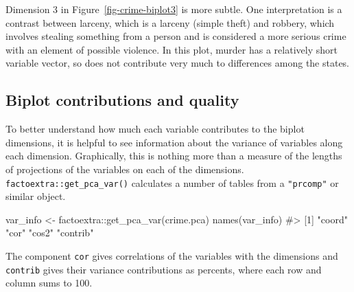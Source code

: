 \documentclass[
  letterpaper,
  10pt,
  krantz2]{krantz}
\makeatletter
\newenvironment{Shaded}{\begin{snugshade}}{\end{snugshade}}
\newcommand{\CommentTok}[1]{\textcolor[rgb]{0.37,0.37,0.37}{#1}}
\newcommand{\FunctionTok}[1]{\textcolor[rgb]{0.28,0.35,0.67}{#1}}
\newcommand{\NormalTok}[1]{\textcolor[rgb]{0.00,0.23,0.31}{#1}}
\newcommand{\OtherTok}[1]{\textcolor[rgb]{0.00,0.23,0.31}{#1}}
\newcommand{\SpecialCharTok}[1]{\textcolor[rgb]{0.37,0.37,0.37}{#1}}
\newenvironment{kframe}{%
  \medskip{}
  \setlength{\fboxsep}{.8em}
  \def\at@end@of@kframe{}%
  \ifinner\ifhmode%
  \def\at@end@of@kframe{\end{minipage}}%
  \begin{minipage}{\columnwidth}%
  \fi\fi%
  \def\FrameCommand##1{\hskip\@totalleftmargin \hskip-\fboxsep
  \colorbox{shadecolor}{##1}\hskip-\fboxsep
      \hskip-\linewidth \hskip-\@totalleftmargin \hskip\columnwidth}%
  \MakeFramed {\advance\hsize-\width
    \@totalleftmargin\z@ \linewidth\hsize
    \@setminipage}}%
{\par\unskip\endMakeFramed%
  \at@end@of@kframe}
\renewenvironment{Shaded}{\begin{kframe}}{\end{kframe}}
\makeatother
\begin{document}
Dimension 3 in Figure~\ref{fig-crime-biplot3} is more subtle. One
interpretation is a contrast between larceny, which is a larceny (simple
theft) and robbery, which involves stealing something from a person and
is considered a more serious crime with an element of possible violence.
In this plot, murder has a relatively short variable vector, so does not
contribute very much to differences among the states.

\subsection{Biplot contributions and
quality}\label{biplot-contributions-and-quality}

To better understand how much each variable contributes to the biplot
dimensions, it is helpful to see information about the variance of
variables along each dimension. Graphically, this is nothing more than a
measure of the lengths of projections of the variables on each of the
dimensions. \texttt{factoextra::get\_pca\_var()} calculates a number of
tables from a \texttt{"prcomp"} or similar object.

\begin{Shaded}
\begin{Highlighting}[]
\NormalTok{var\_info }\OtherTok{\textless{}{-}}\NormalTok{ factoextra}\SpecialCharTok{::}\FunctionTok{get\_pca\_var}\NormalTok{(crime.pca)}
\FunctionTok{names}\NormalTok{(var\_info)}
\CommentTok{\#\textgreater{} [1] "coord"   "cor"     "cos2"    "contrib"}
\end{Highlighting}
\end{Shaded}

The component \texttt{cor} gives correlations of the variables with the
dimensions and \texttt{contrib} gives their variance contributions as
percents, where each row and column sums to 100.
\end{document}
